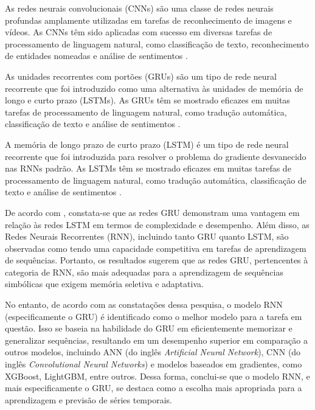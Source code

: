 As redes neurais convolucionais (CNNs) são uma classe de redes neurais profundas amplamente utilizadas em tarefas de reconhecimento de imagens e vídeos. As CNNs têm sido aplicadas com sucesso em diversas tarefas de processamento de linguagem natural, como classificação de texto, reconhecimento de entidades nomeadas e análise de sentimentos \cite{cnn}.
		
As unidades recorrentes com portões (GRUs) são um tipo de rede neural recorrente que foi introduzido como uma alternativa às unidades de memória de longo e curto prazo (LSTMs). As GRUs têm se mostrado eficazes em muitas tarefas de processamento de linguagem natural, como tradução automática, classificação de texto e análise de sentimentos \cite{gru}.
		
A memória de longo prazo de curto prazo (LSTM) é um tipo de rede neural recorrente que foi introduzida para resolver o problema do gradiente desvanecido nas RNNs padrão. As LSTMs têm se mostrado eficazes em muitas tarefas de processamento de linguagem natural, como tradução automática, classificação de texto e análise de sentimentos \cite{lstm}.



De acordo com , constata-se que as redes GRU demonstram uma vantagem em relação às redes LSTM em termos de complexidade e desempenho. Além disso, as Redes Neurais Recorrentes (RNN), incluindo tanto GRU quanto LSTM, são observadas como tendo uma capacidade competitiva em tarefas de aprendizagem de sequências. Portanto, os resultados sugerem que as redes GRU, pertencentes à categoria de RNN, são mais adequadas para a aprendizagem de sequências simbólicas que exigem memória seletiva e adaptativa.

No entanto, de acordo com as constatações dessa pesquisa, o modelo RNN (especificamente o GRU) é identificado como o melhor modelo para a tarefa em questão. Isso se baseia na habilidade do GRU em eficientemente memorizar e generalizar sequências, resultando em um desempenho superior em comparação a outros modelos, incluindo ANN (do inglês \textit{Artificial Neural Network}), CNN (do inglês \textit{Convolutional Neural Networks}) e modelos baseados em gradientes, como XGBoost, LightGBM, entre outros. Dessa forma, conclui-se que o modelo RNN, e mais especificamente o GRU, se destaca como a escolha mais apropriada para a aprendizagem e previsão de séries temporais.


